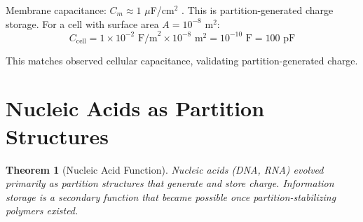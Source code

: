 \documentclass[twocolumn,10pt,a4paper]{article}
\newtheorem{theorem}{Theorem}[section]
\theoremstyle{definition}
\theoremstyle{remark}
\begin{document}
Membrane capacitance: $C_m \approx 1$ $\mu$F/cm$^2$ \cite{hodgkin1952}. This is partition-generated charge storage. For a cell with surface area $A = 10^{-8}$ m$^2$:
\begin{equation}
    C_{\text{cell}} = 1 \times 10^{-2} \text{ F/m}^2 \times 10^{-8} \text{ m}^2 = 10^{-10} \text{ F} = 100 \text{ pF}
\end{equation}

This matches observed cellular capacitance, validating partition-generated charge.

\section{Nucleic Acids as Partition Structures}
\label{sec:nucleic_acids}

\begin{theorem}[Nucleic Acid Function]
\label{thm:nucleic}
Nucleic acids (DNA, RNA) evolved primarily as partition structures that generate and store charge. Information storage is a secondary function that became possible once partition-stabilizing polymers existed.
\end{theorem}
\end{document}
